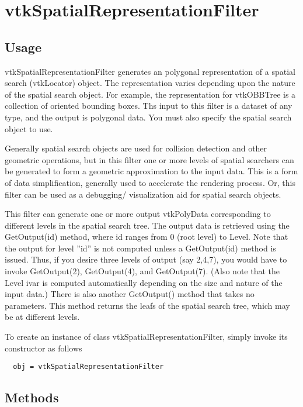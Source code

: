 \section{vtkSpatialRepresentationFilter}

\subsection{Usage}

 vtkSpatialRepresentationFilter generates an polygonal representation of a
 spatial search (vtkLocator) object. The representation varies depending
 upon the nature of the spatial search object. For example, the
 representation for vtkOBBTree is a collection of oriented bounding
 boxes. Ths input to this filter is a dataset of any type, and the output
 is polygonal data. You must also specify the spatial search object to
 use.

 Generally spatial search objects are used for collision detection and
 other geometric operations, but in this filter one or more levels of
 spatial searchers can be generated to form a geometric approximation to
 the input data. This is a form of data simplification, generally used to
 accelerate the rendering process. Or, this filter can be used as a
 debugging/ visualization aid for spatial search objects.
 
 This filter can generate one or more output vtkPolyData corresponding to
 different levels in the spatial search tree. The output data is retrieved 
 using the GetOutput(id) method, where id ranges from 0 (root level) 
 to Level. Note that the output for level ''id'' is not computed unless a 
 GetOutput(id) method is issued. Thus, if you desire three levels of output 
 (say 2,4,7), you would have to invoke GetOutput(2), GetOutput(4), and 
 GetOutput(7). (Also note that the Level ivar is computed automatically 
 depending on the size and nature of the input data.) There is also 
 another GetOutput() method that takes no parameters. This method returns 
 the leafs of the spatial search tree, which may be at different levels.

To create an instance of class vtkSpatialRepresentationFilter, simply
invoke its constructor as follows
\begin{verbatim}
  obj = vtkSpatialRepresentationFilter
\end{verbatim}
\subsection{Methods}

